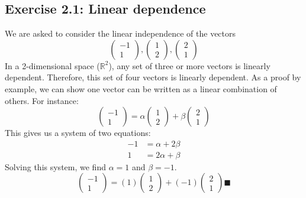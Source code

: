 \documentclass[14pt]{extarticle}
\begin{document}
\subsection*{Exercise 2.1: Linear dependence}
We are asked to consider the linear independence of the vectors
$$ \begin{pmatrix} -1 \\ 1 \end{pmatrix}, \begin{pmatrix} 1 \\ 2 \end{pmatrix}, \begin{pmatrix} 2 \\ 1 \end{pmatrix} $$
In a 2-dimensional space ($\mathbb{R}^2$), any set of three or more vectors is linearly dependent. Therefore, this set of four vectors is linearly dependent.
As a proof by example, we can show one vector can be written as a linear combination of others. For instance:
$$\begin{pmatrix} -1 \\ 1 \end{pmatrix} = \alpha \begin{pmatrix} 1 \\ 2 \end{pmatrix} + \beta \begin{pmatrix} 2 \\ 1 \end{pmatrix} $$
This gives us a system of two equations:
\begin{align*} -1 &= \alpha + 2\beta \\ 1 &= 2\alpha + \beta \end{align*}
Solving this system, we find $\alpha = 1$ and $\beta = -1$.
$$ \begin{pmatrix} -1 \\ 1 \end{pmatrix} = (1) \begin{pmatrix} 1 \\ 2 \end{pmatrix} + (-1) \begin{pmatrix} 2 \\ 1 \end{pmatrix} 
\blacksquare$$
\end{document}
